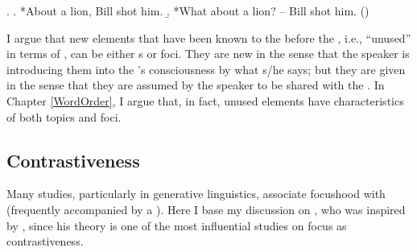 \ex.
  \a. *About a lion, Bill shot him.
  \b. *What about a lion? -- Bill shot him.
     \hfill{()}


I argue that new elements that have been known to the  before the , i.e., ``unused'' in terms of , can be either s or foci.
They are new in the sense that the speaker is introducing them into the 's consciousness by what s/he says;
but they are given in the sense that they are assumed by the speaker to be shared with the .
In Chapter \ref{WordOrder},
I argue that, in fact, unused elements have characteristics of both topics and foci.
%



\subsection{Contrastiveness}\label{Back:Foc:Contr}

Many studies, particularly in generative linguistics,
associate focushood with  (frequently accompanied by a ).
Here I base my discussion on ,
who was inspired by ,
since his theory is one of the most influential studies on focus as contrastiveness.

